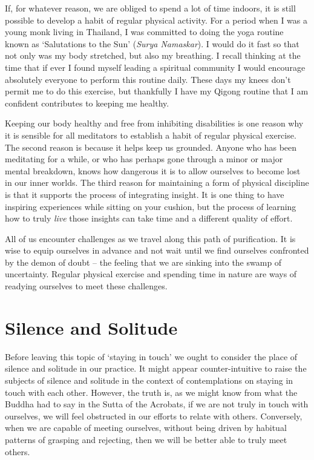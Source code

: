 If, for whatever reason, we are obliged to spend a lot of time indoors,
it is still possible to develop a habit of regular physical activity.
For a period when I was a young monk living in Thailand, I was committed
to doing the yoga routine known as `Salutations to the Sun' (\emph{Surya
Namaskar}). I would do it fast so that not only was my body stretched,
but also my breathing. I recall thinking at the time that if ever I
found myself leading a spiritual community I would encourage absolutely
everyone to perform this routine daily. These days my knees don't permit
me to do this exercise, but thankfully I have my Qigong routine that I
am confident contributes to keeping me healthy.

Keeping our body healthy and free from inhibiting disabilities is one
reason why it is sensible for all meditators to establish a habit of
regular physical exercise. The second reason is because it helps keep us
grounded. Anyone who has been meditating for a while, or who has perhaps
gone through a minor or major mental breakdown, knows how dangerous it
is to allow ourselves to become lost in our inner worlds. The third
reason for maintaining a form of physical discipline is that it supports
the process of integrating insight. It is one thing to have inspiring
experiences while sitting on your cushion, but the process of learning
how to truly \emph{live} those insights can take time and a different
quality of effort.

All of us encounter challenges as we travel along this path of
purification. It is wise to equip ourselves in advance and not wait
until we find ourselves confronted by the demon of doubt -- the feeling
that we are sinking into the swamp of uncertainty. Regular physical
exercise and spending time in nature are ways of readying ourselves to
meet these challenges.

\section{Silence and Solitude}

Before leaving this topic of `staying in touch' we ought to consider the
place of silence and solitude in our practice. It might appear
counter-intuitive to raise the subjects of silence and solitude in the
context of contemplations on staying in touch with each other. However,
the truth is, as we might know from what the Buddha had to say in the
Sutta of the Acrobats\cite{acrobats}, if we are not truly in touch with
ourselves, we will feel obstructed in our efforts to relate with others.
Conversely, when we are capable of meeting ourselves, without being
driven by habitual patterns of grasping and rejecting, then we will be
better able to truly meet others.

